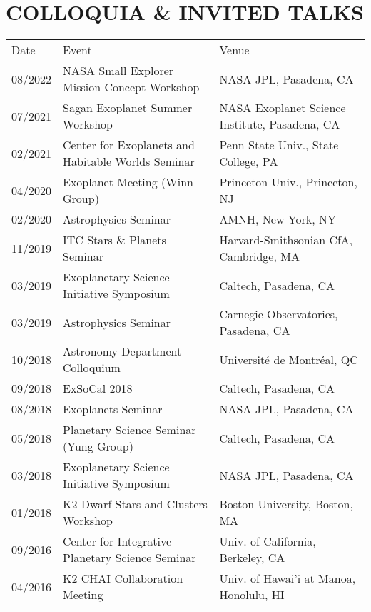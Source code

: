 \section{\large COLLOQUIA \& INVITED TALKS}
\begin{tabular}{lll}
{\sc  Date}  & {\sc  Event} & {\sc  Venue} \\
08/2022 & NASA Small Explorer Mission Concept Workshop & NASA JPL, Pasadena, CA\\
07/2021 & Sagan Exoplanet Summer Workshop & NASA Exoplanet Science Institute, Pasadena, CA \\ %
02/2021 & Center for Exoplanets and Habitable Worlds Seminar & Penn State Univ., State College, PA \\ %
04/2020 & Exoplanet Meeting (Winn Group) & Princeton Univ., Princeton, NJ\\ %
02/2020 & Astrophysics Seminar & AMNH, New York, NY\\ %
11/2019 & ITC Stars \& Planets Seminar &  Harvard-Smithsonian CfA, Cambridge, MA\\ %
03/2019 & Exoplanetary Science Initiative Symposium & Caltech, Pasadena, CA \\ %
03/2019 & Astrophysics Seminar & Carnegie Observatories, Pasadena, CA \\ %
10/2018 & Astronomy Department Colloquium & 
Universit\'{e} de Montr\'{e}al, QC \\ %
09/2018 & ExSoCal 2018 & Caltech, Pasadena, CA \\ %
08/2018 & Exoplanets Seminar & NASA JPL, Pasadena, CA \\ %
05/2018 & Planetary Science Seminar (Yung Group) & Caltech, Pasadena, CA \\%
03/2018 & Exoplanetary Science Initiative Symposium & NASA JPL, Pasadena, CA \\ 
01/2018 & K2 Dwarf Stars and Clusters Workshop & Boston University, Boston, MA \\ %
09/2016 & Center for Integrative Planetary Science Seminar & Univ. of California, Berkeley, CA \\ %
04/2016 & K2 CHAI Collaboration Meeting & Univ. of Hawai'i at M\={a}noa, Honolulu, HI \\ %
\end{tabular}